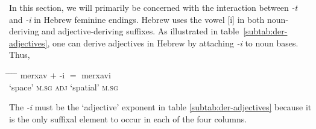 In this section, we will primarily be concerned with the
interaction between \textit{-t} and \textit{-i} in Hebrew feminine endings.
Hebrew uses the vowel [i] 
in both noun-deriving and adjective-deriving suffixes. 
As illustrated in table~\ref{subtab:der-adjectives}, 
one can derive adjectives 
in Hebrew by attaching \textit{-i} to noun bases. Thus,
 \begin{exe} 
\ex \label{ex:finished}
\begin{tabbing}
\hspace{.9in} \= \hspace{.4in} \= \hspace{.5in} \= \hspace{.4in} \= \hspace{.9in} \kill %
merxav \> $+$ \>  -i \> $=$ \>  merxavi \\
`space' \textsc{m.sg}   \> \> \textsc{adj} \>  \> `spatial' \textsc{m.sg}  \\
\end{tabbing}
\end{exe}
The \textit{-i} 
must be the `adjective' exponent
in table \ref{subtab:der-adjectives} because it is the only suffixal 
element to occur in each
of the four columns. %

